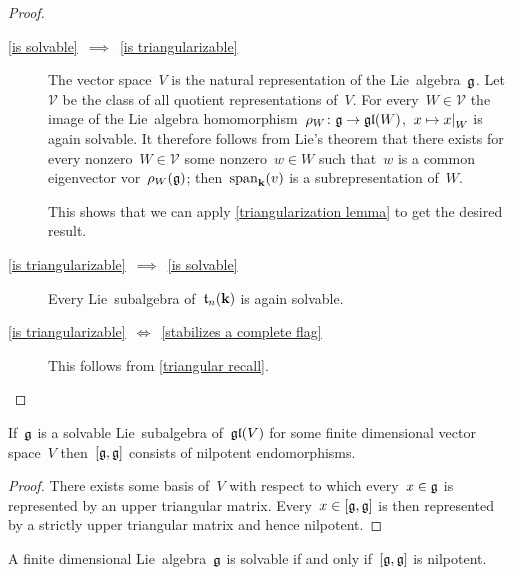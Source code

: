 \begin{proof}
  \leavevmode
  \begin{description}
    \item[\ref*{is solvable}~$\implies$~\ref*{is triangularizable}]
      The vector space~$V$ is the natural representation of the Lie~algebra~$\mathfrak{g}$.
      Let~$\mathcal{V}$ be the class of all quotient representations of~$V$.
      For every~$W \in \mathcal{V}$ the image of the Lie~algebra homomorphism~$\rho_W \colon\mathfrak{g} \to \mathfrak{gl}(W)$,~$x \mapsto \restrict{x}{W}$ is again solvable.
      It therefore follows from Lie’s theorem that there exists for every nonzero~$W \in \mathcal{V}$ some nonzero~$w \in W$ such that~$w$ is a common eigenvector vor~$\rho_W(\mathfrak{g})$;
      then~$\operatorname{span}_{\mathbf{k}}(v)$ is a {\onedimensional} subrepresentation of~$W$.
      
      This shows that we can apply \cref{triangularization lemma} to get the desired result.
    \item[\ref*{is triangularizable}~$\implies$~\ref*{is solvable}]
      Every Lie~subalgebra of~$\mathfrak{t}_n(\mathbf{k})$ is again solvable.
    \item[\ref*{is triangularizable}~$\iff$~\ref*{stabilizes a complete flag}]
      This follows from \cref{triangular recall}.
    \qedhere
  \end{description}
\end{proof}


\begin{corollary}
  \label{solvable linear lie algebra has commutator consisting of nilpotent endomorphisms}
  If~$\mathfrak{g}$ is a solvable Lie~subalgebra of~$\mathfrak{gl}(V)$ for some finite dimensional vector space~$V$ then~$[\mathfrak{g}, \mathfrak{g}]$ consists of nilpotent endomorphisms.
\end{corollary}


\begin{proof}
  There exists some basis of~$V$ with respect to which every~$x \in \mathfrak{g}$ is represented by an upper triangular matrix.
  Every~$x \in [\mathfrak{g}, \mathfrak{g}]$ is then represented by a strictly upper triangular matrix and hence nilpotent.
\end{proof}


\begin{corollary}
  \label{solvable iff derived is nilpotent}
  A finite dimensional Lie~algebra~$\mathfrak{g}$ is solvable if and only if~$[\mathfrak{g}, \mathfrak{g}]$ is nilpotent.
\end{corollary}


